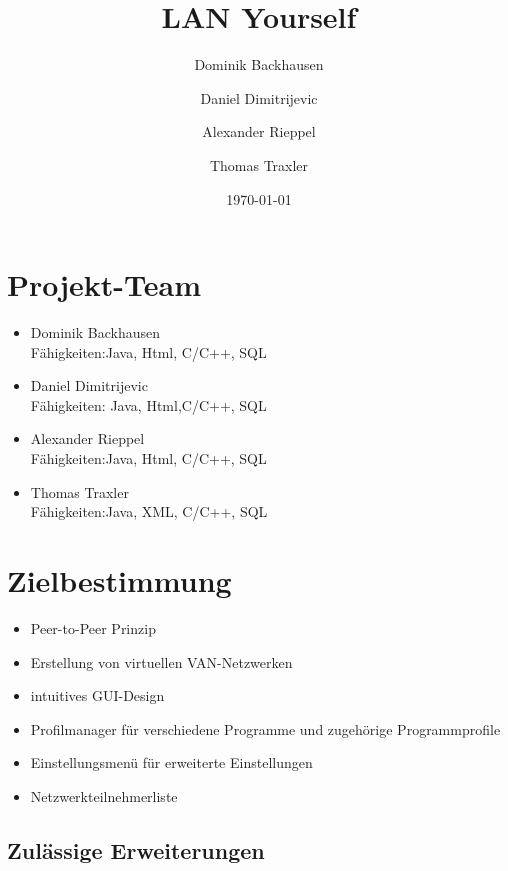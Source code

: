 \documentclass[a4paper,12pt]{scrreprt}
\begin{document}
\author{Dominik Backhausen \and Daniel Dimitrijevic \and Alexander Rieppel \and Thomas Traxler}
\subject{Pflichtenheft}
\title{LAN Yourself}
\date{\today}
\maketitle
\tableofcontents

\chapter{Projekt-Team}
	\begin{itemize}
	\item Dominik Backhausen\\
	Fähigkeiten:Java, Html, C/C++, SQL
	\item Daniel Dimitrijevic\\
	Fähigkeiten: Java, Html,C/C++, SQL
	\item Alexander Rieppel\\
		Fähigkeiten:Java, Html, C/C++, SQL    
	\item Thomas Traxler\\
	Fähigkeiten:Java, XML, C/C++, SQL
	\end{itemize}
	
	
\chapter{Zielbestimmung}
	\begin{itemize}
	\item Peer-to-Peer Prinzip
	\item Erstellung von virtuellen VAN-Netzwerken
	\item intuitives GUI-Design
	\item Profilmanager für verschiedene Programme und zugehörige Programmprofile
	\item Einstellungsmenü für erweiterte Einstellungen
	\item Netzwerkteilnehmerliste
	\end{itemize}
	
	\section{Zulässige Erweiterungen}
	
\end{document}
